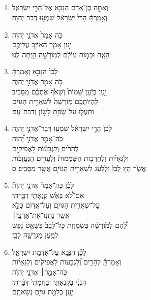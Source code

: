 \documentclass[12pt,a4paper,titlepage]{article}
\def \pscolor{red} %
\def \pslabelsep{0.2em} %
\def \psleftmargin{0em} %
\begin{document}
\begin{hebrew}
      \subsection*{}
      \vspace{-0.6mm}
      \begin{enumerate}[leftmargin=\psleftmargin, labelsep=\pslabelsep, label=\fontspec{Linux Libertine}\arabic*, font=\color{\pscolor}\small\textsuperscript, parsep=0em, itemsep=0em, topsep=0em]
            \item וְאַתָּ֣ה בֶן־אָדָ֔ם הִנָּבֵ֖א אֶל־הָרֵ֣י יִשְׂרָאֵ֑ל \\ וְאָ֣מַרְתָּ֔ הָרֵי֙ יִשְׂרָאֵ֔ל שִׁמְע֖וּ דְּבַר־יְהוָֽה׃
            \item כֹּ֤ה אָמַר֙ אֲדֹנָ֣י יְהוִ֔ה \\ יַ֣עַן אָמַ֧ר הָאוֹיֵ֛ב עֲלֵיכֶ֖ם \\ הֶאָ֑ח וּבָמ֣וֹת עוֹלָ֔ם לְמֽוֹרָשָׁ֖ה הָ֥יְתָה לָּֽנוּ׃
            \item לָכֵן֙ הִנָּבֵ֣א וְאָמַרְתָּ֔ \\ כֹּ֥ה אָמַ֖ר אֲדֹנָ֣י יְהוִ֑ה \\ יַ֣עַן בְּיַ֡עַן שַׁמּוֹת֩ וְשָׁאֹ֙ף אֶתְכֶ֜ם מִסָּבִ֗יב \\ לִֽהְיוֹתְכֶ֤ם מֽוֹרָשָׁה֙ לִשְׁאֵרִ֣ית הַגּוֹיִ֔ם \\ וַתֵּֽעֲל֛וּ עַל־שְׂפַ֥ת לָשׁ֖וֹן וְדִבַּת־עָֽם׃
            \item לָכֵן֙ הָרֵ֣י יִשְׂרָאֵ֔ל שִׁמְע֖וּ דְּבַר־אֲדֹנָ֣י יְהוִ֑ה \\ כֹּֽה־אָמַ֣ר אֲדֹנָ֣י יְ֠הוִה \\ לֶהָרִ֙ים וְלַגְּבָע֜וֹת לָאֲפִיקִ֣ים \\ וְלַגֵּאָי֗וֹת וְלֶחֳרָב֤וֹת הַשֹּֽׁמְמוֹת֙ וְלֶעָרִ֣ים הַנֶּעֱזָב֔וֹת\\  אֲשֶׁ֙ר הָי֤וּ לְבַז֙ וּלְלַ֔עַג לִשְׁאֵרִ֥ית הַגּוֹיִ֖ם אֲשֶׁ֥ר מִסָּבִֽיב׃ ס
            \item לָכֵ֗ן כֹּֽה־אָמַר֘ אֲדֹנָ֣י יְהוִה֒ \\ אִם־לֹ֠א בְּאֵ֙שׁ קִנְאָתִ֥י דִבַּ֛רְתִּי \\ עַל־שְׁאֵרִ֥ית הַגּוֹיִ֖ם וְעַל־אֱד֣וֹם כֻּלָּ֑א \\ אֲשֶׁ֣ר נָתְנֽוּ־אֶת־אַרְצִ֣י׀ \\ לָ֠הֶם לְמ֙וֹרָשָׁ֜ה בְּשִׂמְחַ֤ת כָּל־לֵבָב֙ בִּשְׁאָ֣ט נֶ֔פֶשׁ \\ לְמַ֥עַן מִגְרָשָׁ֖הּ לָבַֽז׃
            \item לָכֵ֕ן הִנָּבֵ֖א עַל־אַדְמַ֣ת יִשְׂרָאֵ֑ל \\ וְאָמַרְתָּ֡ לֶהָרִ֣ים וְ֠לַגְּבָעוֹת לָאֲפִיקִ֙ים וְלַגֵּאָי֜וֹת \\ כֹּֽה־אָמַ֣ר׀ אֲדֹנָ֣י יְהוִ֗ה \\ הִנְנִ֙י בְקִנְאָתִ֤י וּבַחֲמָתִי֙ דִּבַּ֔רְתִּי \\ יַ֛עַן כְּלִמַּ֥ת גּוֹיִ֖ם נְשָׂאתֶֽם׃

\end{enumerate}
\end{hebrew}
\end{document}
